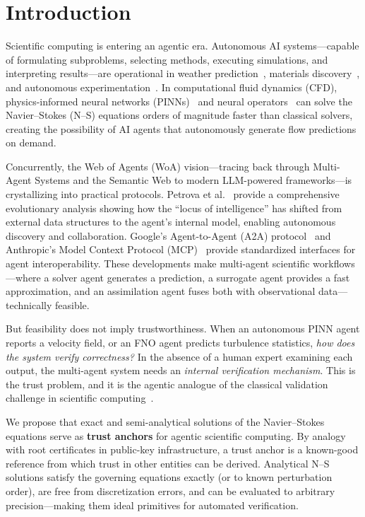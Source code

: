 \documentclass[conference]{IEEEtran}
\begin{document}
\section{Introduction}

Scientific computing is entering an agentic era. Autonomous AI systems---capable of formulating subproblems, selecting methods, executing simulations, and interpreting results---are operational in weather prediction~\cite{Lam2023,Bi2023}, materials discovery~\cite{MatAgent2024}, and autonomous experimentation~\cite{Boiko2023}. In computational fluid dynamics (CFD), physics-informed neural networks (PINNs)~\cite{Raissi2019} and neural operators~\cite{Li2021FNO,Lu2021} can solve the Navier--Stokes (N--S) equations orders of magnitude faster than classical solvers, creating the possibility of AI agents that autonomously generate flow predictions on demand.

Concurrently, the Web of Agents (WoA) vision---tracing back through Multi-Agent Systems and the Semantic Web to modern LLM-powered frameworks---is crystallizing into practical protocols. Petrova et al.~\cite{PetrovaWoA2025} provide a comprehensive evolutionary analysis showing how the ``locus of intelligence'' has shifted from external data structures to the agent's internal model, enabling autonomous discovery and collaboration. Google's Agent-to-Agent (A2A) protocol~\cite{A2A2025} and Anthropic's Model Context Protocol (MCP)~\cite{MCP2024} provide standardized interfaces for agent interoperability. These developments make multi-agent scientific workflows---where a solver agent generates a prediction, a surrogate agent provides a fast approximation, and an assimilation agent fuses both with observational data---technically feasible.

But feasibility does not imply trustworthiness. When an autonomous PINN agent reports a velocity field, or an FNO agent predicts turbulence statistics, \emph{how does the system verify correctness?} In the absence of a human expert examining each output, the multi-agent system needs an \emph{internal verification mechanism}. This is the trust problem, and it is the agentic analogue of the classical validation challenge in scientific computing~\cite{Oberkampf2010}.

We propose that exact and semi-analytical solutions of the Navier--Stokes equations serve as \textbf{trust anchors} for agentic scientific computing. By analogy with root certificates in public-key infrastructure, a trust anchor is a known-good reference from which trust in other entities can be derived. Analytical N--S solutions satisfy the governing equations exactly (or to known perturbation order), are free from discretization errors, and can be evaluated to arbitrary precision---making them ideal primitives for automated verification.
\end{document}
